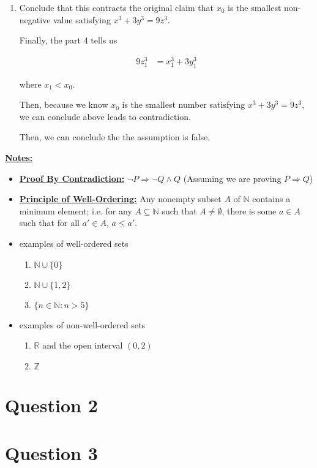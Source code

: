 \documentclass[12pt]{article}
\begin{document}
\begin{mdframed}
\begin{enumerate}[1.]
\begin{mdframed}
        \end{mdframed}

        \item Conclude that this contracts the original claim that $x_0$ is the smallest
        non-negative value satisfying $x^3 + 3y^3 = 9z^3$.

        \begin{mdframed}
        Finally, the part 4 tells us

        \begin{align}
            9z_1^3 &= x_1^3 + 3y_1^3
        \end{align}

        where $x_1 < x_0$.

        \bigskip

        Then, because we know $x_0$ is the smallest
        number satisfying $x^3 + 3y^3 = 9z^3$, we can conclude above leads to
        contradiction.

        \bigskip

        Then, we can conclude the the assumption is false.
        \end{mdframed}
    \end{enumerate}

\end{mdframed}

\bigskip

\underline{\textbf{Notes:}}

\begin{itemize}
    \item \underline{\textbf{Proof By Contradiction:}} $\neg P \Rightarrow \neg Q \land Q$ (Assuming
    we are proving $P \Rightarrow Q$)
    \item \underline{\textbf{Principle of Well-Ordering:}} Any nonempty subset $A$
    of $\mathbb{N}$ contains a minimum element; i.e. for any $A \subseteq \mathbb{N}$
    such that $A \neq \emptyset$, there is some $a \in A$ such that for all $a' \in A$, $a \leq a'$.

    \item examples of well-ordered sets
    \begin{enumerate}[1.]
        \item $\mathbb{N} \cup \{0\}$
        \item $\mathbb{N} \cup \{1,2\}$
        \item $\{n \in \mathbb{N}: n > 5\}$
    \end{enumerate}
    \item examples of non-well-ordered sets
    \begin{enumerate}[1.]
        \item $\mathbb{R}$ and the open interval $(0,2)$
        \item $\mathbb{Z}$
    \end{enumerate}
\end{itemize}

\section*{Question 2}

\section*{Question 3}
\end{document}
